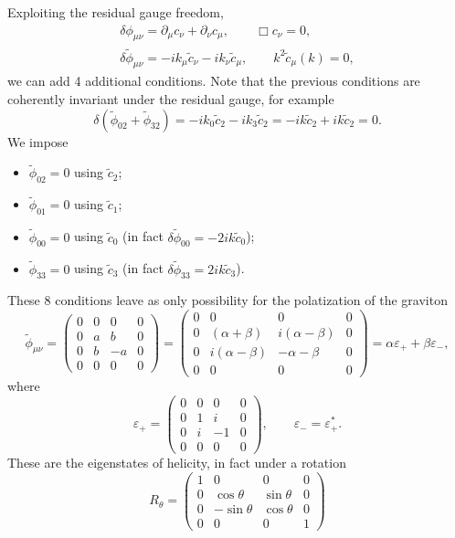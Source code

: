 \documentclass[a4paper,12pt]{book}
\renewcommand{\epsilon}{\varepsilon}
\theoremstyle{definition}
\theoremstyle{remark}
\begin{document}
Exploiting the residual gauge freedom,
\begin{gather*}
\delta\phi_{\mu\nu}=\partial_\mu c_\nu+\partial_\nu c_\mu,\qquad \Box c_\nu=0,\\
\delta\tilde\phi_{\mu\nu}=-ik_\mu\tilde c_\nu-ik_\nu\tilde c_\mu,\qquad k^2\tilde c_\mu(k)=0,
\end{gather*}
we can add 4 additional conditions. Note that the previous conditions are coherently invariant under the residual gauge, for example
\[\delta(\tilde\phi_{02}+\tilde\phi_{32})=-ik_0\tilde c_2-ik_3\tilde c_2=-ik\tilde c_2+ik\tilde c_2=0.\]
We impose
\begin{itemize}
\item $\tilde\phi_{02}=0$ using $\tilde c_2$;
\item $\tilde\phi_{01}=0$ using $\tilde c_1$;
\item $\tilde\phi_{00}=0$ using $\tilde c_0$ (in fact $\delta\tilde\phi_{00}=-2ik\tilde c_0$);
\item $\tilde\phi_{33}=0$ using $\tilde c_3$ (in fact $\delta\tilde\phi_{33}=2ik\tilde c_3$).
\end{itemize}
These 8 conditions leave as only possibility for the polatization of the graviton
\[\tilde\phi_{\mu\nu}=
\begin{pmatrix}
0 & 0 & 0 & 0\\
0 & a & b & 0\\
0 & b & -a & 0\\
0 & 0 & 0 & 0
\end{pmatrix}=
\begin{pmatrix}
0 & 0 & 0 & 0\\
0 & (\alpha+\beta) & i(\alpha-\beta) & 0\\
0 & i(\alpha-\beta) & -\alpha-\beta & 0\\
0 & 0 & 0 & 0
\end{pmatrix}
=\alpha\epsilon_++\beta\epsilon_-,\]
where
\[\epsilon_+=
\begin{pmatrix}
0 & 0 & 0 & 0\\
0 & 1 & i & 0\\
0 & i & -1 & 0\\
0 & 0 & 0 & 0
\end{pmatrix},\qquad
\epsilon_-=\epsilon_+^*.
\]
These are the eigenstates of helicity, in fact under a rotation
\[R_\theta=
\begin{pmatrix}
1 & 0 & 0 & 0\\
0 & \cos\theta & \sin\theta & 0\\
0 & -\sin\theta & \cos\theta & 0\\
0 & 0 & 0 & 1
\end{pmatrix}\]
\end{document}
